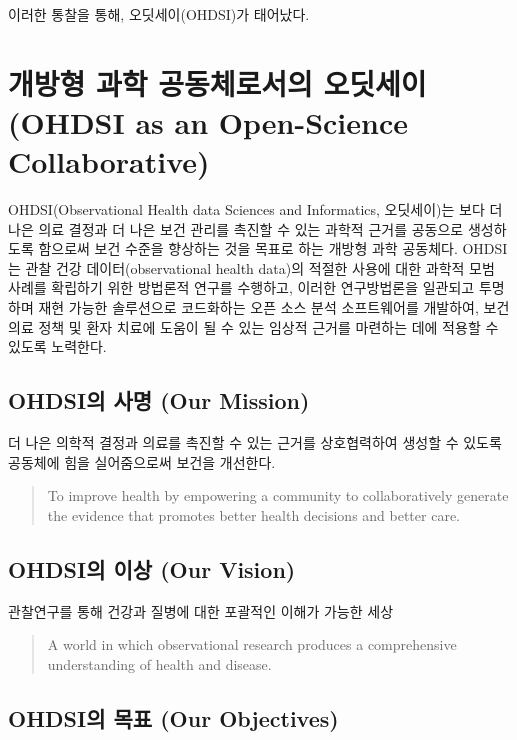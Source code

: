 \documentclass[11pt]{book}
\theoremstyle{definition}
\theoremstyle{definition}
\theoremstyle{definition}
\theoremstyle{remark}
\begin{document}
이러한 통찰을 통해, 오딧세이(OHDSI)가 태어났다.

\section{개방형 과학 공동체로서의 오딧세이 (OHDSI as an Open-Science
Collaborative)}\label{----ohdsi-as-an-open-science-collaborative}

OHDSI(Observational Health data Sciences and Informatics, 오딧세이)는
보다 더 나은 의료 결정과 더 나은 보건 관리를 촉진할 수 있는 과학적
근거를 공동으로 생성하도록 함으로써 보건 수준을 향상하는 것을 목표로
하는 개방형 과학 공동체다. \citep{Hripcsak2015} OHDSI는 관찰 건강
데이터(observational health data)의 적절한 사용에 대한 과학적 모범
사례를 확립하기 위한 방법론적 연구를 수행하고, 이러한 연구방법론을
일관되고 투명하며 재현 가능한 솔루션으로 코드화하는 오픈 소스 분석
소프트웨어를 개발하여, 보건의료 정책 및 환자 치료에 도움이 될 수 있는
임상적 근거를 마련하는 데에 적용할 수 있도록 노력한다.

\subsection{OHDSI의 사명 (Our Mission)}\label{ohdsi--our-mission}

더 나은 의학적 결정과 의료를 촉진할 수 있는 근거를 상호협력하여 생성할
수 있도록 공동체에 힘을 실어줌으로써 보건을 개선한다.

\begin{quote}
To improve health by empowering a community to collaboratively generate
the evidence that promotes better health decisions and better care.
\end{quote}

\subsection{OHDSI의 이상 (Our Vision)}\label{ohdsi--our-vision}

관찰연구를 통해 건강과 질병에 대한 포괄적인 이해가 가능한 세상

\begin{quote}
A world in which observational research produces a comprehensive
understanding of health and disease. 
\end{quote}

\subsection{OHDSI의 목표 (Our Objectives)}\label{ohdsi--our-objectives}
\end{document}

